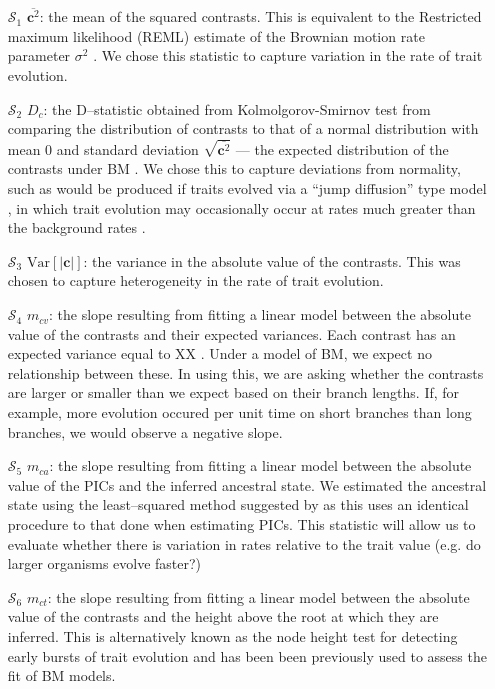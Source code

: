\documentclass[12pt]{article}
\begin{document}
\begin{enumerate}
\item[$\mathcal{S}_1$] $\overline{\mathbf{c}^2}$: the mean of the squared contrasts. This is equivalent to the Restricted maximum likelihood (REML) estimate of the Brownian motion rate parameter $\sigma^2$ \citep{Garland1992, Rohlf2001}. We chose this statistic to capture variation in the rate of trait evolution.

\item[$\mathcal{S}_2$] $D_c$: the D--statistic obtained from Kolmolgorov-Smirnov test \citep{ks} from comparing the distribution of contrasts to that of a normal distribution with mean 0 and standard deviation $\sqrt{\overline{\mathbf{c}^2}}$ --- the expected distribution of the contrasts under BM \citep{Felsenstein1985, Rohlf2001}. We chose this to capture deviations from normality, such as would be produced if traits evolved via a ``jump diffusion'' type model \citep{Landis2013, Eastmanjump}, in which trait evolution may occasionally occur at rates much greater than the background rates \citep[see][]{PennellPE}.

\item[$\mathcal{S}_3$] $\mathrm{Var}[| \mathbf{c} |]$: the variance in the absolute value of the contrasts. This was chosen to capture heterogeneity in the rate of trait evolution.

\item[$\mathcal{S}_4$] $m_{cv}$: the slope resulting from fitting a linear model between the absolute value of the contrasts and their expected variances. Each contrast has an expected variance equal to XX \citep{Felsenstein1985}. Under a model of BM, we expect no relationship between these. In using this, we are asking whether the contrasts are larger or smaller than we expect based on their branch lengths. If, for example, more evolution occured per unit time on short branches than long branches, we would observe a negative slope. \citep{Garlandetal1992}

\item[$\mathcal{S}_5$] $m_{ca}$: the slope resulting from fitting a linear model between the absolute value of the PICs and the inferred ancestral state. We estimated the ancestral state using the least--squared method suggested by \citep{Felsenstein1985} as this uses an identical procedure to that done when estimating PICs. This statistic will allow us to evaluate whether there is variation in rates relative to the trait value (e.g. do larger organisms evolve faster?) \citep{Garlandetal1992}

\item[$\mathcal{S}_6$] $m_{ct}$: the slope resulting from fitting a linear model between the absolute value of the contrasts and the height above the root at which they are inferred. This is alternatively known as the node height test \citep{FreckletonHarvey2006, SlaterPennell} for detecting early bursts of trait evolution and has been been previously used to assess the fit of BM models. \citep{Garlandetal1992}
\end{enumerate}
\end{document}
